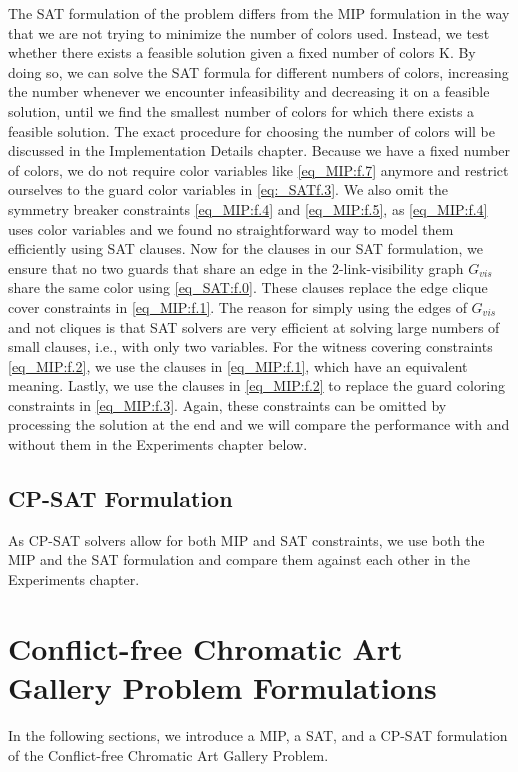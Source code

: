 The SAT formulation of the problem differs from the MIP formulation in the way that we are not trying to minimize the number of colors used. Instead, we test whether there exists a feasible solution given a fixed number of colors K. By doing so, we can solve the SAT formula for different numbers of colors, increasing the number whenever we encounter infeasibility and decreasing it on a feasible solution, until we find the smallest number of colors for which there exists a feasible solution. The exact procedure for choosing the number of colors will be discussed in the Implementation Details chapter. Because we have a fixed number of colors, we do not require color variables like \cref{eq_MIP:f.7} anymore and restrict ourselves to the guard color variables in \cref{eq:_SATf.3}. We also omit the symmetry breaker constraints \cref{eq_MIP:f.4} and \cref{eq_MIP:f.5}, as \cref{eq_MIP:f.4} uses color variables and we found no straightforward way to model them efficiently using SAT clauses. Now for the clauses in our SAT formulation, we ensure that no two guards that share an edge in the 2-link-visibility graph $G_{vis}$ share the same color using \cref{eq_SAT:f.0}. These clauses replace the edge clique cover constraints in \cref{eq_MIP:f.1}. The reason for simply using the edges of $G_{vis}$ and not cliques is that SAT solvers are very efficient at solving large numbers of small clauses, i.e., with only two variables. For the witness covering constraints \cref{eq_MIP:f.2}, we use the clauses in \cref{eq_MIP:f.1}, which have an equivalent meaning. Lastly, we use the clauses in \cref{eq_MIP:f.2} to replace the guard coloring constraints in \cref{eq_MIP:f.3}. Again, these constraints can be omitted by processing the solution at the end and we will compare the performance with and without them in the Experiments chapter below.

\section{CP-SAT Formulation}

As CP-SAT solvers allow for both MIP and SAT constraints, we use both the MIP and the SAT formulation and compare them against each other in the Experiments chapter.

\chapter{Conflict-free Chromatic Art Gallery Problem Formulations}

In the following sections, we introduce a MIP, a SAT, and a CP-SAT formulation of the Conflict-free Chromatic Art Gallery Problem.

